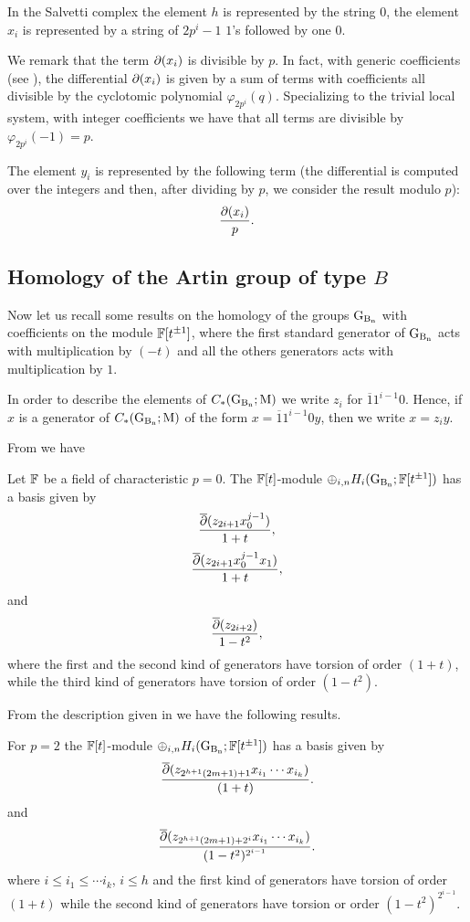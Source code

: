 In the Salvetti complex the element $h$ is represented by the string $0$, the element $x_i$ is 
represented by a string of $2p^i -1$ $1$'s followed by one $0$. %

We remark that the term $\partial(x_i)$ is divisible by $p$. In fact, with generic coefficients (see \cite{cal06}), the differential $\partial(x_i)$ is given by a sum of terms with coefficients all divisible by the cyclotomic polynomial $\varphi_{2p^i}(q)$. Specializing to the trivial local system, with integer coefficients we have that all terms are divisible by $\varphi_{2p^i}(-1) = p$.

The element $y_i$ is represented by the following term (the differential is computed over 
the integers and then, 
after dividing by $p$, we  consider the result modulo $p$):
$$
\frac{\partial(x_i)}{p}.
$$

\subsection{Homology of the Artin group of type $B$}
Now let us recall some results on the homology of the groups $\operatorname{G_{B_{n}}}$ with coefficients on the module $\mathbb{F}[t^{\pm 1}]$, where the first standard generator of  $\operatorname{G_{B_{n}}}$ acts with multiplication by $(-t)$ and all the others generators acts with multiplication by $1$.

In order to describe the elements of $C_*(\operatorname{G_{B_{n}}};\mathrm{M})$ we write $z_i$ for $\overline{1}1^{i-1}0$. Hence, if $x$ is a generator of $C_*(\operatorname{G_{B_{n}}};\mathrm{M})$ of the form $x = \overline{1}1^{i-1}0y$, then we write $x = z_iy$.

From \cite[Sec.~4.2]{calmar} we have
\begin{prop} \label{prop:hrazionale}
Let  $\mathbb{F}$ be a field of characteristic $p=0$. The $\mathbb{F}[t]$-module $\oplus_{i,n} H_i(\operatorname{G_{B_{n}}}; \mathbb{F}[t^{{\pm 1}}])$ has a basis given by
$$
\frac{\overline{\partial} (z_{2i+1}x_0^{j-1})}{1+t},
$$
$$
\frac{\overline{\partial} (z_{2i+1}x_0^{j-1}x_1)}{1+t},
$$
and
$$
\frac{\overline{\partial} (z_{2i+2})}{1-t^2},
$$
where the first and the second kind of generators have torsion of order $(1+t)$, while the third kind of generators have torsion of order $(1-t^2)$.
\end{prop}

From the description given in \cite[Thm.~4.5, Thm.~4.12]{calmar} we have the following results.

\begin{prop}\label{prop:homol_p2}
For $p=2$ the  $\mathbb{F}[t]$-module $\oplus_{i,n} H_i(\operatorname{G_{B_{n}}}; \mathbb{F}[t^{\pm 1}])$ has a basis given by
\begin{equation}\label{generators_21}
\frac{\overline{\partial}(z_{2^{h+1}(2m+1)+1}x_{i_1} \cdots x_{i_k})}{(1+t)}.
\end{equation}
and
\begin{equation}\label{generators_022}
\frac{\overline{\partial}(z_{2^{h+1}(2m+1)+2^i}x_{i_1} \cdots x_{i_k})}{(1-t^2)^{2^{i-1}}}.
\end{equation}
where $i \leq i_1 \leq \cdots i_k$, $i \leq h$ and the first kind of generators have
torsion of order $(1+t)$ while the second kind of generators have torsion or order $(1-t^2)^{2^{i-1}}$.\end{prop}

